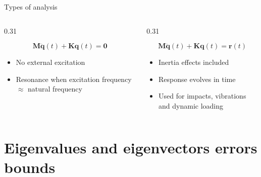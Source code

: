 \documentclass[aspectratio=169]{beamer}
\begin{document}
{\begin{frame}{Types of analysis}
\begin{columns}[T,onlytextwidth]
      \begin{column}{0.31\textwidth}
        \begin{block}{}
          \centering
          \small
          \[
            \mathbf M\ddot{\mathbf q}(t)
            +
            \mathbf K\mathbf q(t)
            =
            \mathbf 0
          \]
          \vspace{-0.45cm}
          \footnotesize
          \begin{itemize}
            \item No external excitation
            \item Resonance when excitation frequency $\approx$ natural frequency
          \end{itemize}
        \end{block}
      \end{column}

      \begin{column}{0.31\textwidth}

        \begin{block}{}
          \centering
          \small
          \[
            \mathbf M\ddot{\mathbf q}(t)
            +
            \mathbf K\mathbf q(t)
            =
            \mathbf r(t)
          \]
          \vspace{-0.45cm}
          \footnotesize
          \begin{itemize}
            \item Inertia effects included
            \item Response evolves in time
            \item Used for impacts, vibrations and dynamic loading
          \end{itemize}
        \end{block}
      \end{column}
    \end{columns}
  \end{frame}
 }

\section{Eigenvalues and eigenvectors errors bounds}
\end{document}
